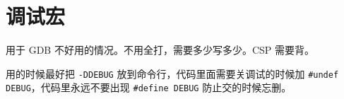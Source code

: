 \section{调试宏}

用于 GDB 不好用的情况。不用全打，需要多少写多少。CSP 需要背。

用的时候最好把 \verb|-DDEBUG| 放到命令行，代码里面需要关调试的时候加
\lstinline|#undef DEBUG|，代码里永远不要出现 \lstinline|#define DEBUG|
防止交的时候忘删。


